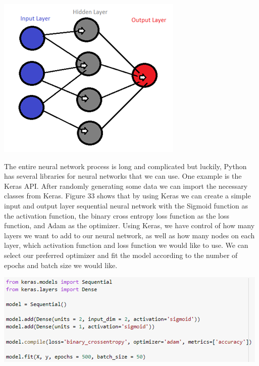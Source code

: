 \documentclass[a4paper,12pt]{report}
\begin{document}
\begin{center}
    \captionsetup{type=figure}
    \includegraphics[width=.9\linewidth]{media/NeuralNetwork.png}
\end{center}

The entire neural network process is long and complicated but luckily, Python has several libraries for neural networks that we can use. One example is the Keras API. After randomly generating some data we can import the necessary classes from Keras. Figure 33 shows that by using Keras we can create a simple input and output layer sequential neural network with the Sigmoid function as the activation function, the binary cross entropy loss function as the loss function, and Adam as the optimizer. Using Keras, we have control of how many layers we want to add to our neural network, as well as how many nodes on each layer, which activation function and loss function we would like to use. We can select our preferred optimizer and fit the model according to the number of epochs and batch size we would like. 

\begin{center}
    \captionsetup{type=figure}
    \includegraphics[width=.9\linewidth]{media/kerasmodels.png}
\end{center}
\end{document}
